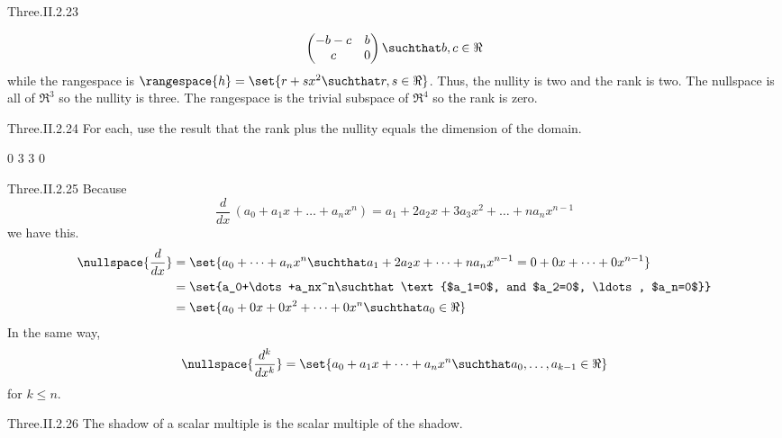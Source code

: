 \begin{ans}{Three.II.2.23}
\begin{exparts}
\begin{equation*}
{\begin{pmatrix}
                                 -b-c  &b  \\
                                  c    &0
                               \end{pmatrix} \suchthat b,c\in\Re }
          \end{equation*}
          while the rangespace is
          $\rangespace{h}=\set{r+sx^2\suchthat r,s\in\Re}$.
          Thus, the nullity is two and the rank is two.
        \partsitem The nullspace is all of \( \Re^3 \)
          so the nullity is three.
          The rangespace is the trivial subspace of \( \Re^4 \) so the rank
          is zero.
      \end{exparts}
    
\end{ans}
\begin{ans}{Three.II.2.24}
      For each, use the result
      that the rank plus the nullity equals the dimension of the domain.
      \begin{exparts*}
        \partsitem $0$
        \partsitem $3$
        \partsitem $3$
        \partsitem $0$
      \end{exparts*}
    
\end{ans}
\begin{ans}{Three.II.2.25}
      Because
      \begin{equation*}
        \frac{d}{dx}\,(a_0+a_1x+\dots+a_nx^n)
        =a_1+2a_2x+3a_3x^2+\dots+na_nx^{n-1}
      \end{equation*}
      we have this.
      \begin{align*}
        \nullspace{\frac{d}{dx}}
        &=\set{a_0+\dots+a_nx^n\suchthat a_1+2a_2x+\dots+na_nx^{n-1}
                                         =0+0x+\dots+0x^{n-1}}       \\
        &=\set{a_0+\dots+a_nx^n\suchthat
               \text{$a_1=0$, and $a_2=0$, \ldots, $a_n=0$}}  \\
        &=\set{a_0+0x+0x^2+\dots+0x^n\suchthat a_0\in\Re}
      \end{align*}
      In the same way,
      \begin{equation*}
        \nullspace{\frac{d^k}{dx^k}}
        =\set{a_0+a_1x+\dots+a_nx^n\suchthat a_0,\dots,a_{k-1}\in\Re}
      \end{equation*}
      for \( k\leq n \).
    
\end{ans}
\begin{ans}{Three.II.2.26}
      The shadow of a scalar multiple is the scalar multiple of the shadow.
    
\end{ans}
